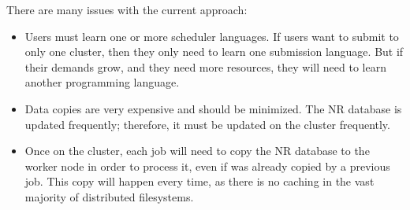 There are many issues with the current approach:

\begin{itemize}
	\item Users must learn one or more scheduler languages.  If users want to submit to only one cluster, then they only need to learn one submission language.  But if their demands grow, and they need more resources, they will need to learn another programming language.
	\item Data copies are very expensive and should be minimized.  The NR database is updated frequently;  therefore, it must be updated on the cluster frequently.
	\item Once on the cluster, each job will need to copy the NR database to the worker node in order to process it, even if was already copied by a previous job.  This copy will happen every time, as there is no caching in the vast majority of distributed filesystems.
\end{itemize}







